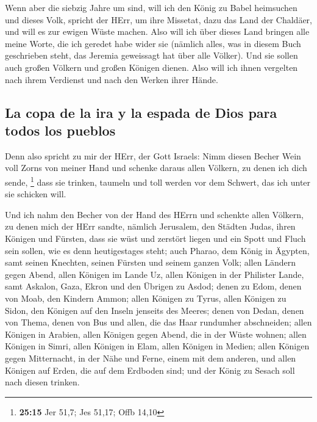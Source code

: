  Wenn aber die siebzig Jahre um sind, will ich den König
zu Babel heimsuchen und dieses Volk, spricht der HErr, um ihre Missetat,
dazu das Land der Chaldäer, und will es zur ewigen Wüste machen.
 Also will ich über dieses Land bringen alle meine Worte,
die ich geredet habe wider sie (nämlich alles, was in diesem Buch
geschrieben steht, das Jeremia geweissagt hat über alle Völker).
 Und sie sollen auch großen Völkern und großen Königen
dienen. Also will ich ihnen vergelten nach ihrem Verdienst und nach den
Werken ihrer Hände.

\hypertarget{la-copa-de-la-ira-y-la-espada-de-dios-para-todos-los-pueblos}{%
\subsection{La copa de la ira y la espada de Dios para todos los
pueblos}\label{la-copa-de-la-ira-y-la-espada-de-dios-para-todos-los-pueblos}}

 Denn also spricht zu mir der HErr, der Gott Israels:
Nimm diesen Becher Wein voll Zorns von meiner Hand und schenke daraus
allen Völkern, zu denen ich dich sende, \footnote{\textbf{25:15} Jer
  51,7; Jes 51,17; Offb 14,10}  dass sie trinken, taumeln
und toll werden vor dem Schwert, das ich unter sie schicken will.

 Und ich nahm den Becher von der Hand des HErrn und
schenkte allen Völkern, zu denen mich der HErr sandte, 
nämlich Jerusalem, den Städten Judas, ihren Königen und Fürsten, dass
sie wüst und zerstört liegen und ein Spott und Fluch sein sollen, wie es
denn heutigestages steht;  auch Pharao, dem König in
Ägypten, samt seinen Knechten, seinen Fürsten und seinem ganzen Volk;
 allen Ländern gegen Abend, allen Königen im Lande Uz,
allen Königen in der Philister Lande, samt Askalon, Gaza, Ekron und den
Übrigen zu Asdod;  denen zu Edom, denen von Moab, den
Kindern Ammon;  allen Königen zu Tyrus, allen Königen zu
Sidon, den Königen auf den Inseln jenseits des Meeres; 
denen von Dedan, denen von Thema, denen von Bus und allen, die das Haar
rundumher abschneiden;  allen Königen in Arabien, allen
Königen gegen Abend, die in der Wüste wohnen;  allen
Königen in Simri, allen Königen in Elam, allen Königen in Medien;
 allen Königen gegen Mitternacht, in der Nähe und Ferne,
einem mit dem anderen, und allen Königen auf Erden, die auf dem Erdboden
sind; und der König zu Sesach soll nach diesen trinken.

